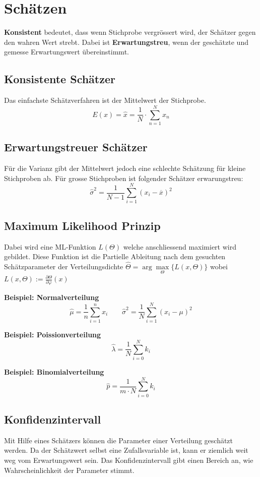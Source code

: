 \section{Schätzen}\label{schaetzen}
\textbf{Konsistent} bedeutet, dass wenn Stichprobe vergrössert wird, der Schätzer gegen den wahren Wert strebt. Dabei ist \textbf{Erwartungstreu}, wenn der geschätzte und gemesse Erwartungswert übereinstimmt.

\subsection{Konsistente Schätzer}
Das einfachste Schätzverfahren ist der Mittelwert der Stichprobe.
\[
E(x) = \hat{x} = \frac{1}{N}\cdot \sum\limits_{n=1}^{N}x_n
\]

\subsection{Erwartungstreuer Schätzer}
Für die Varianz gibt der Mittelwert jedoch eine schlechte Schätzung für kleine Stichproben ab. Für grosse Stichproben ist folgender Schätzer erwarungstreu:
\[
\hat{\sigma}^2 = \frac{1}{N-1}\sum\limits_{i=1}^{N}(x_i - \overline{x})^2
\]

\subsection{Maximum Likelihood Prinzip}
Dabei wird eine ML-Funktion $L(\Theta)$ welche anschliessend maximiert wird gebildet. Diese Funktion ist die Partielle Ableitung nach dem gesuchten Schätzparameter der Verteilungsdichte $\hat{\Theta}  = \arg\max\limits_\Theta\{L(x,\Theta)\}$ wobei $L(x,\Theta) := \frac{\partial\Theta}{\partial\varphi}(x)$

\textbf{Beispiel: Normalverteilung}
\[
\hat{\mu} = \frac{1}{n}\sum\limits_{i=1}^{n}x_i \qquad \hat{\sigma}^2  = \frac{1}{N}\sum\limits_{i=1}^{N}(x_i -\mu)^2
\]

\noindent\textbf{Beispiel: Poissionverteilung} 
\[
\hat{\lambda} = \frac{1}{N}\sum\limits_{i=0}^{N}k_i
\]

\noindent\textbf{Beispiel: Binomialverteilung} 
\[
\hat{p} = \frac{1}{m\cdot N}\sum\limits_{i=0}^{N}k_i
\]


\subsection{Konfidenzintervall}\label{quantilentabelle}
Mit Hilfe eines Schätzers können die Parameter einer Verteilung geschätzt werden. Da der Schätzwert selbst eine Zufallsvariable ist, kann er ziemlich weit weg vom Erwartungswert sein. Das Konfidenzintervall gibt einen Bereich an, wie Wahrscheinlichkeit der Parameter stimmt. 


